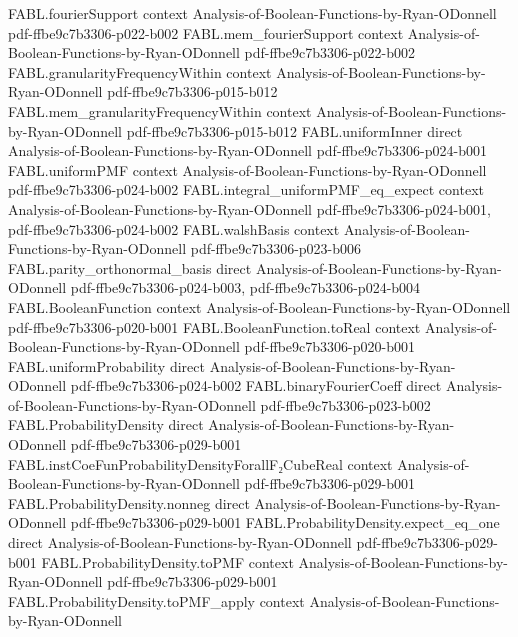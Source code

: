 \begin{theorem}
  {FABL.fourierSupport}
  {context}
  {Analysis-of-Boolean-Functions-by-Ryan-ODonnell}
  {pdf-ffbe9c7b3306-p022-b002}
\proofstep
  {FABL.mem_fourierSupport}
  {context}
  {Analysis-of-Boolean-Functions-by-Ryan-ODonnell}
  {pdf-ffbe9c7b3306-p022-b002}
\proofstep
  {FABL.granularityFrequencyWithin}
  {context}
  {Analysis-of-Boolean-Functions-by-Ryan-ODonnell}
  {pdf-ffbe9c7b3306-p015-b012}
\proofstep
  {FABL.mem_granularityFrequencyWithin}
  {context}
  {Analysis-of-Boolean-Functions-by-Ryan-ODonnell}
  {pdf-ffbe9c7b3306-p015-b012}
\proofstep
  {FABL.uniformInner}
  {direct}
  {Analysis-of-Boolean-Functions-by-Ryan-ODonnell}
  {pdf-ffbe9c7b3306-p024-b001}
\proofstep
  {FABL.uniformPMF}
  {context}
  {Analysis-of-Boolean-Functions-by-Ryan-ODonnell}
  {pdf-ffbe9c7b3306-p024-b002}
\proofstep
  {FABL.integral_uniformPMF_eq_expect}
  {context}
  {Analysis-of-Boolean-Functions-by-Ryan-ODonnell}
  {pdf-ffbe9c7b3306-p024-b001,
    pdf-ffbe9c7b3306-p024-b002}
\proofstep
  {FABL.walshBasis}
  {context}
  {Analysis-of-Boolean-Functions-by-Ryan-ODonnell}
  {pdf-ffbe9c7b3306-p023-b006}
\proofstep
  {FABL.parity_orthonormal_basis}
  {direct}
  {Analysis-of-Boolean-Functions-by-Ryan-ODonnell}
  {pdf-ffbe9c7b3306-p024-b003,
    pdf-ffbe9c7b3306-p024-b004}
\proofstep
  {FABL.BooleanFunction}
  {context}
  {Analysis-of-Boolean-Functions-by-Ryan-ODonnell}
  {pdf-ffbe9c7b3306-p020-b001}
\proofstep
  {FABL.BooleanFunction.toReal}
  {context}
  {Analysis-of-Boolean-Functions-by-Ryan-ODonnell}
  {pdf-ffbe9c7b3306-p020-b001}
\proofstep
  {FABL.uniformProbability}
  {direct}
  {Analysis-of-Boolean-Functions-by-Ryan-ODonnell}
  {pdf-ffbe9c7b3306-p024-b002}
\proofstep
  {FABL.binaryFourierCoeff}
  {direct}
  {Analysis-of-Boolean-Functions-by-Ryan-ODonnell}
  {pdf-ffbe9c7b3306-p023-b002}
\proofstep
  {FABL.ProbabilityDensity}
  {direct}
  {Analysis-of-Boolean-Functions-by-Ryan-ODonnell}
  {pdf-ffbe9c7b3306-p029-b001}
\proofstep
  {FABL.instCoeFunProbabilityDensityForallF₂CubeReal}
  {context}
  {Analysis-of-Boolean-Functions-by-Ryan-ODonnell}
  {pdf-ffbe9c7b3306-p029-b001}
\proofstep
  {FABL.ProbabilityDensity.nonneg}
  {direct}
  {Analysis-of-Boolean-Functions-by-Ryan-ODonnell}
  {pdf-ffbe9c7b3306-p029-b001}
\proofstep
  {FABL.ProbabilityDensity.expect_eq_one}
  {direct}
  {Analysis-of-Boolean-Functions-by-Ryan-ODonnell}
  {pdf-ffbe9c7b3306-p029-b001}
\proofstep
  {FABL.ProbabilityDensity.toPMF}
  {context}
  {Analysis-of-Boolean-Functions-by-Ryan-ODonnell}
  {pdf-ffbe9c7b3306-p029-b001}
\proofstep
  {FABL.ProbabilityDensity.toPMF_apply}
  {context}
  {Analysis-of-Boolean-Functions-by-Ryan-ODonnell}

\end{theorem}
